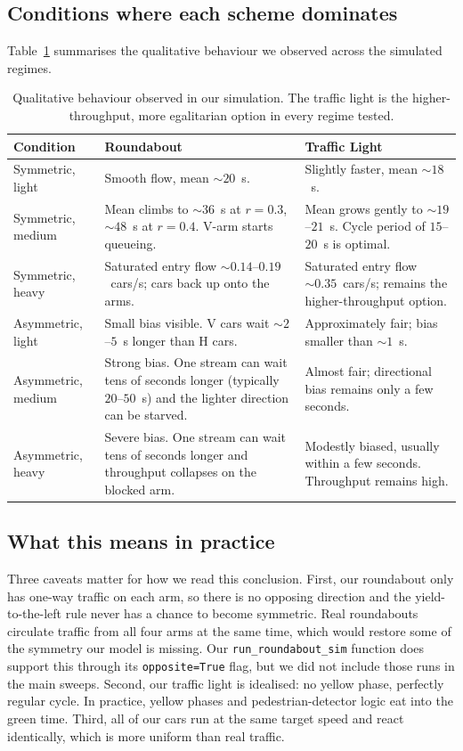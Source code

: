 \documentclass[11pt]{article}
\begin{document}
\subsection{Conditions where each scheme dominates}
Table~\ref{tab:comparison} summarises the qualitative behaviour we observed across the simulated regimes.

\begin{table}[H]
\centering
\renewcommand{\arraystretch}{1.3}
\small
\begin{tabular}{|p{3cm}|p{5.6cm}|p{5.6cm}|}
\hline
\textbf{Condition} & \textbf{Roundabout} & \textbf{Traffic Light} \\ \hline
Symmetric, light & Smooth flow, mean $\sim 20$~s. & Slightly faster, mean $\sim 18$~s. \\ \hline
Symmetric, medium & Mean climbs to $\sim 36$~s at $r=0.3$, $\sim 48$~s at $r=0.4$. V-arm starts queueing. & Mean grows gently to $\sim 19$--$21$~s. Cycle period of $15$--$20$~s is optimal. \\ \hline
Symmetric, heavy & Saturated entry flow $\sim 0.14$--$0.19$~cars/s; cars back up onto the arms. & Saturated entry flow $\sim 0.35$~cars/s; remains the higher-throughput option. \\ \hline
Asymmetric, light & Small bias visible. V cars wait $\sim 2$--$5$~s longer than H cars. & Approximately fair; bias smaller than $\sim 1$~s. \\ \hline
Asymmetric, medium & Strong bias. One stream can wait tens of seconds longer (typically $20$--$50$~s) and the lighter direction can be starved. & Almost fair; directional bias remains only a few seconds. \\ \hline
Asymmetric, heavy & Severe bias. One stream can wait tens of seconds longer and throughput collapses on the blocked arm. & Modestly biased, usually within a few seconds. Throughput remains high. \\ \hline
\end{tabular}
\caption{Qualitative behaviour observed in our simulation. The traffic light is the higher-throughput, more egalitarian option in every regime tested.}
\label{tab:comparison}
\end{table}

\subsection{What this means in practice}
Three caveats matter for how we read this conclusion. First, our roundabout only has one-way traffic on each arm, so there is no opposing direction and the yield-to-the-left rule never has a chance to become symmetric. Real roundabouts circulate traffic from all four arms at the same time, which would restore some of the symmetry our model is missing. Our \texttt{run\_roundabout\_sim} function does support this through its \texttt{opposite=True} flag, but we did not include those runs in the main sweeps. Second, our traffic light is idealised: no yellow phase, perfectly regular cycle. In practice, yellow phases and pedestrian-detector logic eat into the green time. Third, all of our cars run at the same target speed and react identically, which is more uniform than real traffic.
\end{document}
